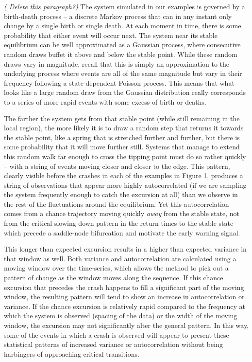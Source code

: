 \documentclass[authoryear,review,12pt]{elsarticle}
\newcommand{\cb}[1]{{\it \color{darkgreen} (#1)}}
\begin{document}
\cb{ Delete this paragraph?}
The system simulated in our examples is governed by a birth-death process --
a discrete Markov process that can in any instant only change by a single 
birth or single death.  At each moment in time, there is some probability 
that either event will occur next.  The system near its stable equilibrium
can be well approximated as a Gaussian process, where consecutive random 
draws buffet it above and below the stable point. While these random draws
vary in magnitude, recall that this is simply an approximation to the 
underlying process where events are all of the same magnitude but vary
in their frequency following a state-dependent Poisson process.  This 
means that what looks like a large random draw from the Gaussian distribution
really corresponds to a series of more rapid events with some excess of 
birth or deaths.  

The farther the system gets from that stable point (while still 
remaining in the local region), the more likely it is to draw a random step 
that returns it towards the stable point, like a spring that is stretched 
further and further, but there is some probability that it will move further
still. Systems that manage to extend this random walk far enough to cross the
tipping point must do so rather quickly -- with a string of events moving 
closer and closer to the edge.  This pattern, clearly visible before the 
crashes in each of the examples in Figure 1, produces a string of observations
that appear more highly autocorrelated (if we are sampling the system
frequently enough to catch the excursion at all) than we observe in the rest
of the fluctuations around the equilibrium.  Yet this autocorrelation comes from
a chance trajectory moving quickly \emph{away} from the stable state, not from
the critical slowing down pattern in the return times to the stable state
which precede a saddle-node bifurcation and motivate the early warning signal.



This longer than expected excursion results in a higher than expected variance
in that window as well. Both variance and autocorrelation are calculated using
a moving window over the time-series, which allows the method to pick out a 
pattern of change as the window moves along the sequence. If this chance excursion 
that precedes the crash happens to fill a significant part of the moving window,
the resulting pattern will tend to show an increase in autocorrelation or variance.
If the chance excursion is relatively rapid compared to the frequency at which
the system is observed (spacing of the data) or the width of the moving window, 
the excursion may not significantly alter the general pattern.  In this way, 
some of the events in which a crash is observed will appear to present these
statistical patterns of increased variance or autocorrelation without being
harbingers of approaching critical transitions.  
\end{document}
